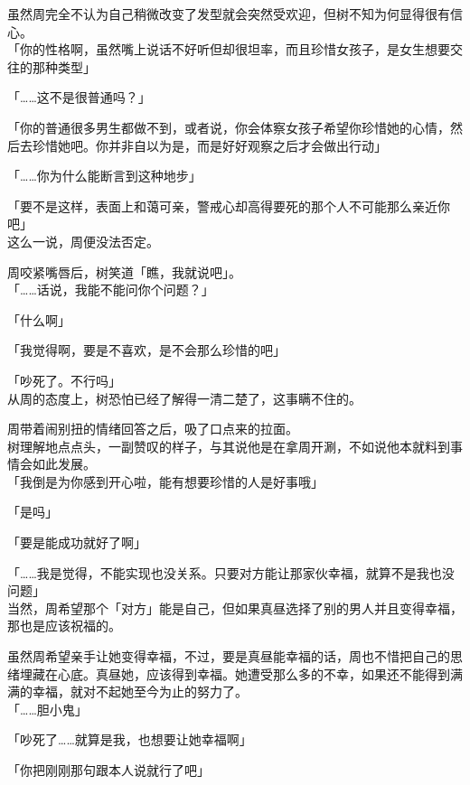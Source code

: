 虽然周完全不认为自己稍微改变了发型就会突然受欢迎，但树不知为何显得很有信心。\\

「你的性格啊，虽然嘴上说话不好听但却很坦率，而且珍惜女孩子，是女生想要交往的那种类型」

「……这不是很普通吗？」

「你的普通很多男生都做不到，或者说，你会体察女孩子希望你珍惜她的心情，然后去珍惜她吧。你并非自以为是，而是好好观察之后才会做出行动」

「……你为什么能断言到这种地步」

「要不是这样，表面上和蔼可亲，警戒心却高得要死的那个人不可能那么亲近你吧」\\

这么一说，周便没法否定。

周咬紧嘴唇后，树笑道「瞧，我就说吧」。\\

「……话说，我能不能问你个问题？」

「什么啊」

「我觉得啊，要是不喜欢，是不会那么珍惜的吧」

「吵死了。不行吗」\\

从周的态度上，树恐怕已经了解得一清二楚了，这事瞒不住的。

周带着闹别扭的情绪回答之后，吸了口点来的拉面。\\

树理解地点点头，一副赞叹的样子，与其说他是在拿周开涮，不如说他本就料到事情会如此发展。\\

「我倒是为你感到开心啦，能有想要珍惜的人是好事哦」

「是吗」

「要是能成功就好了啊」

「……我是觉得，不能实现也没关系。只要对方能让那家伙幸福，就算不是我也没问题」\\

当然，周希望那个「对方」能是自己，但如果真昼选择了别的男人并且变得幸福，那也是应该祝福的。

虽然周希望亲手让她变得幸福，不过，要是真昼能幸福的话，周也不惜把自己的思绪埋藏在心底。真昼她，应该得到幸福。她遭受那么多的不幸，如果还不能得到满满的幸福，就对不起她至今为止的努力了。\\

「……胆小鬼」

「吵死了……就算是我，也想要让她幸福啊」

「你把刚刚那句跟本人说就行了吧」

